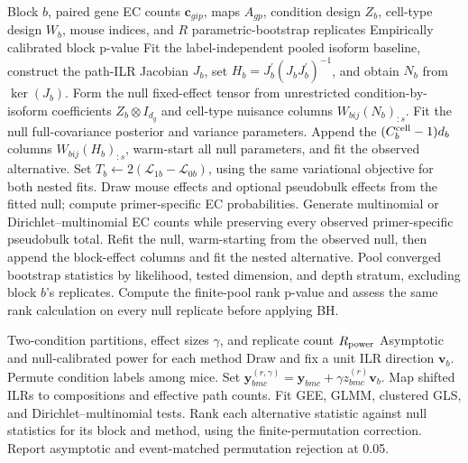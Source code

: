 \documentclass[11pt]{article}
\begin{document}
\begin{algorithm}[H]
\caption{Block-specific paired EC-count GLMM cell-type test}
\label{alg:block-count-glmm}
\begin{algorithmic}[1]
\Require Block \(b\), paired gene EC counts \(\bm c_{gip}\), maps \(A_{gp}\), condition design \(Z_b\), cell-type design \(W_b\), mouse indices, and \(R\) parametric-bootstrap replicates
\Ensure Empirically calibrated block p-value
\State Fit the label-independent pooled isoform baseline, construct the path-ILR Jacobian \(J_b\), set \(H_b=J_b^\prime(J_bJ_b^\prime)^{-1}\), and obtain \(N_b\) from \(\ker(J_b)\).
\State Form the null fixed-effect tensor from unrestricted condition-by-isoform coefficients \(Z_b\otimes I_{d_g}\) and cell-type nuisance columns \(W_{bij}(N_b)_{:s}\).
\State Fit the null full-covariance posterior and variance parameters.
\State Append the \((C_b^{\rm cell}-1)d_b\) columns \(W_{bij}(H_b)_{:s}\), warm-start all null parameters, and fit the observed alternative.
\State Set \(T_b\gets2(\mathcal L_{1b}-\mathcal L_{0b})\), using the same variational objective for both nested fits.
  \State Draw mouse effects and optional pseudobulk effects from the fitted null; compute primer-specific EC probabilities.
  \State Generate multinomial or Dirichlet--multinomial EC counts while preserving every observed primer-specific pseudobulk total.
  \State Refit the null, warm-starting from the observed null, then append the block-effect columns and fit the nested alternative.
\EndFor
\State Pool converged bootstrap statistics by likelihood, tested dimension, and depth stratum, excluding block \(b\)'s replicates.
\State Compute the finite-pool rank p-value and assess the same rank calculation on every null replicate before applying BH.
\end{algorithmic}
\end{algorithm}

\begin{algorithm}[H]
\caption{Matched semi-synthetic power benchmark}
\label{alg:cluster-power}
\begin{algorithmic}[1]
\Require Two-condition partitions, effect sizes \(\gamma\), and replicate count \(R_{\rm power}\)
\Ensure Asymptotic and null-calibrated power for each method
  \State Draw and fix a unit ILR direction \(\bm v_b\).
    \State Permute condition labels among mice.
      \State Set \(\bm y_{bmc}^{(r,\gamma)} =\bm y_{bmc}+\gamma z_{bmc}^{(r)}\bm v_b\).
      \State Map shifted ILRs to compositions and effective path counts.
      \State Fit GEE, GLMM, clustered GLS, and Dirichlet--multinomial tests.
    \EndFor
  \EndFor
\EndFor
\State Rank each alternative statistic against null statistics for its block and method, using the finite-permutation correction.
\State Report asymptotic and event-matched permutation rejection at 0.05.
\end{algorithmic}
\end{algorithm}
\end{document}
